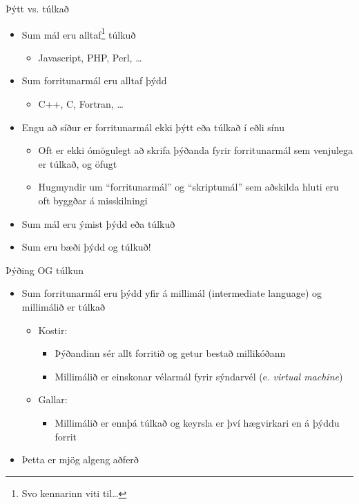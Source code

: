 \documentclass[handout]{beamer}
\begin{document}
\begin{frame}{Þýtt vs. túlkað}
\begin{itemize}
 \item Sum mál eru alltaf\footnote{Svo kennarinn viti til\ldots} túlkuð
 \begin{itemize}
  \item Javascript, PHP, Perl, \ldots
 \end{itemize}
  \item Sum forritunarmál eru alltaf þýdd
 \begin{itemize}
  \item C++, C, Fortran, \ldots
 \end{itemize}
 \item Engu að síður er forritunarmál ekki þýtt eða túlkað í eðli sínu
 \begin{itemize}
  \item Oft er ekki ómögulegt að skrifa þýðanda fyrir forritunarmál sem venjulega er túlkað, og öfugt
  \item Hugmyndir um ``forritunarmál'' og ``skriptumál'' sem aðskilda hluti eru oft byggðar á misskilningi
 \end{itemize}
 \item Sum mál eru ýmist þýdd eða túlkuð
 \item Sum eru bæði þýdd og túlkuð!
\end{itemize}
\end{frame}

\begin{frame}{Þýðing OG túlkun}
\begin{itemize}
 \item Sum forritunarmál eru þýdd yfir á millimál (intermediate language) og millimálið er túlkað
 \begin{itemize}
  \item Kostir:
  \begin{itemize}
   \item Þýðandinn sér allt forritið og getur bestað millikóðann
   \item Millimálið er einskonar vélarmál fyrir sýndarvél (e. \emph{virtual machine})
  \end{itemize}
  \item Gallar:
  \begin{itemize}
   \item Millimálið er ennþá túlkað og keyrsla er því hægvirkari en á þýddu forrit
  \end{itemize}
 \end{itemize}
 \item Þetta er mjög algeng aðferð
\end{itemize}
\end{frame}
\end{document}
